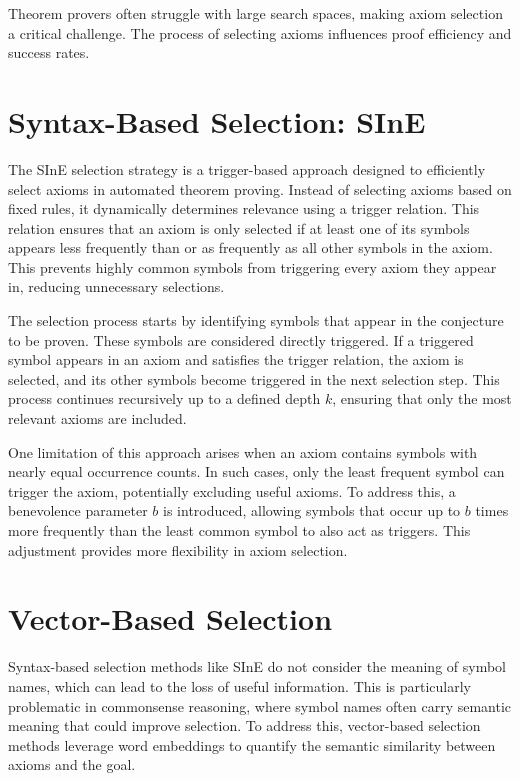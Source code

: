 \documentclass[english,version-2020-11]{uzl-thesis}
\begin{document}
Theorem provers often struggle with large search spaces, making axiom selection a critical challenge. The process of selecting axioms influences proof efficiency and success rates.

\section{Syntax-Based Selection: SInE}

The SInE selection strategy \cite{Hoder2011} is a trigger-based approach designed to efficiently select axioms in automated theorem proving. Instead of selecting axioms based on fixed rules, it dynamically determines relevance using a trigger relation. This relation ensures that an axiom is only selected if at least one of its symbols appears less frequently than or as frequently as all other symbols in the axiom. This prevents highly common symbols from triggering every axiom they appear in, reducing unnecessary selections.

The selection process starts by identifying symbols that appear in the conjecture to be proven. These symbols are considered directly triggered. If a triggered symbol appears in an axiom and satisfies the trigger relation, the axiom is selected, and its other symbols become triggered in the next selection step. This process continues recursively up to a defined depth \( k \), ensuring that only the most relevant axioms are included.

One limitation of this approach arises when an axiom contains symbols with nearly equal occurrence counts. In such cases, only the least frequent symbol can trigger the axiom, potentially excluding useful axioms. To address this, a benevolence parameter \( b \) is introduced, allowing symbols that occur up to \( b \) times more frequently than the least common symbol to also act as triggers. This adjustment provides more flexibility in axiom selection.

\section{Vector-Based Selection}

Syntax-based selection methods like SInE do not consider the meaning of symbol names, which can lead to the loss of useful information. This is particularly problematic in commonsense reasoning, where symbol names often carry semantic meaning that could improve selection. To address this, vector-based selection methods leverage word embeddings to quantify the semantic similarity between axioms and the goal.
\end{document}
